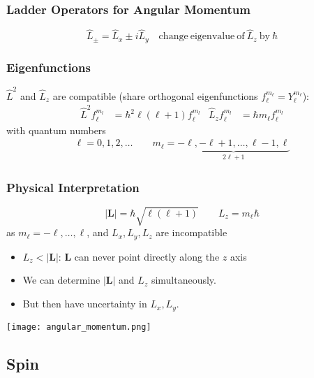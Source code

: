 \subsubsection{Ladder Operators for Angular Momentum}

\noindent\begin{equation*}
    \widehat{L}_{\pm}=\widehat{L}_x\pm i \widehat{L}_y \quad \mathrm{change\ eigenvalue\ of\ } \widehat{L}_z \mathrm{\ by\ } \hbar
\end{equation*}

\subsubsection{Eigenfunctions}

$\widehat{L}^2$ and $\widehat{L}_z$ are compatible (share orthogonal eigenfunctions $f_{\ell}^{m_\ell}=Y_{\ell}^{m_\ell}$):
\begin{align*}
    \widehat{L}^2 f_{\ell}^{m_l} & =\hbar^{2}\ell (\ell+1) f_{\ell}^{m_l} &
    \widehat{L}_z f_{\ell}^{m_l} & =\hbar m_\ell f_{\ell}^{m_l}
\end{align*}
with quantum numbers
\begin{align*}
    \ell  =0, 1, 2,\ldots\qquad  m_\ell = \underbrace{-\ell, -\ell+1, \ldots, \ell-1, \ell}_{2\ell+1}
\end{align*}

\subsubsection{Physical Interpretation}
\noindent\begin{equation*}
    |\mathbf{L}|  =\hbar\sqrt{\ell(\ell+1)} \qquad
    L_{z}=m_{\ell}\hbar
\end{equation*}
as $m_{\ell}=-\ell,\dots,\ell$, and $L_x, L_y, L_z$ are incompatible
\begin{itemize}
    \item $L_z < |\mathbf{L}|$: $\mathbf{L}$ can never point directly along the $z$ axis
    \item We can determine $|\mathbf{L}|$ and $L_{z}$ simultaneously.
    \item But then have uncertainty in $L_x, L_y$.
\end{itemize}
\begin{center}
    \texttt{[image: angular\_momentum.png]}
\end{center}

\subsection{Spin}
